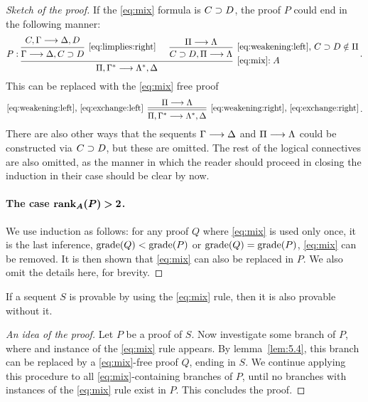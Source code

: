 \documentclass[11pt,a4paper]{article}
\begin{document}
\begin{proof}[Sketch of the proof]
    If the \eqref{eq:mix} formula is \(C\supset D\),
    the proof \(P\) could end in the following manner:
    \begin{equation*}
        P:
        \begin{prooftree}
            \hypo{C,\Gamma\seq\Delta,D}
            \infer1[\eqref{eq:limplies:right}]{\Gamma\seq\Delta,C\limplies D}
            \hypo{\Pi\seq\Lambda}
            \infer1[\eqref{eq:weakening:left}, \(C\limplies D\notin\Pi\)]{C\limplies D,\Pi\seq\Lambda}
            \infer2[\eqref{eq:mix}\(:A\)]{\Pi,\Gamma^*\seq\Lambda^*,\Delta}
        \end{prooftree}\,.
    \end{equation*}
    This can be replaced with the \eqref{eq:mix} free proof
    \begin{equation*}
        \begin{prooftree}
            \hypo{\Pi\seq\Lambda}
            \infer[double, left label={\eqref{eq:weakening:left}, \eqref{eq:exchange:left}}]1[\eqref{eq:weakening:right}, \eqref{eq:exchange:right}]{\Pi,\Gamma^*\seq\Lambda^*,\Delta}
        \end{prooftree}\,.
    \end{equation*}
    There are also other ways that the sequents \(\Gamma\longrightarrow\Delta\) and
    \(\Pi\longrightarrow\Lambda\) could be constructed via \(C\supset D\),
    but these are omitted. The rest of the logical connectives are also
    omitted, as the manner in which the reader should proceed in
    closing the induction in their case should be clear by now.

    \paragraph{The case \(\bm{\rank_A(P) > 2}\).}
    We use induction as follows:
    for any proof \(Q\) where \eqref{eq:mix} is used only once,
    it is the last inference, \(\operatorname{grade}(Q) < \operatorname{grade}(P)\) or
    \(\operatorname{grade}(Q) = \operatorname{grade}(P)\), \eqref{eq:mix} can be removed.
    It is then shown that \eqref{eq:mix} can also be replaced in \(P\).
    We also omit the details here, for brevity.
\end{proof}

\begin{theorem}[Theorem 5.3]\label{the:5.3}
    If a sequent \(S\) is provable by using the \eqref{eq:mix} rule,
    then it is also provable without it.
\end{theorem}

\begin{proof}[An idea of the proof]
    Let \(P\) be a proof of \(S\).
    Now investigate some branch of \(P\),
    where and instance of the \eqref{eq:mix} rule appears.
    By lemma~\ref{lem:5.4}, this branch can be replaced by
    a \eqref{eq:mix}-free proof \(Q\), ending in \(S\).
    We continue applying this procedure to all
    \eqref{eq:mix}-containing branches of \(P\),
    until no branches with instances of the \eqref{eq:mix} rule
    exist in \(P\). This concludes the proof.
\end{proof}
\end{document}
